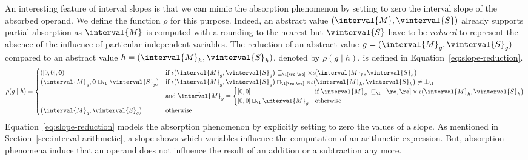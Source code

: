 An interesting feature of interval slopes is that we can mimic the
absorption phenomenon by setting to zero the interval slope of the
absorbed operand. We define the function $\rho$ for this
purpose. Indeed, an abstract value $(\interval{M}, \vinterval{S})$
already supports partial absorption as $\interval{M}$ is computed with
a rounding to the nearest but $\vinterval{S}$ have to be
\textit{reduced} to represent the absence of the influence of
particular independent variables. The reduction of an abstract value
$g=(\interval{M}_g, \vinterval{S}_g)$ compared to an abstract value
$h=(\interval{M}_h, \vinterval{S}_h)$, denoted by $\rho(g \mid h)$, is
defined in Equation~\eqref{eq:slope-reduction}.  {\small
  \begin{equation}
    \label{eq:slope-reduction}
    \rho(g \mid h) =         
    \begin{cases}
      ([0, 0], \mathbf{0}) & \text{if } 
      \iota\big(\interval{M}_g, \vinterval{S}_g\big)
      \sqsubseteq_\I [\re,\re]
      \times \iota\big(\interval{M}_h, \vinterval{S}_h\big)
      \\
      \big(\tilde{\interval{M}}_g, 
      \mathbf{0}\ \dot{\sqcup}_\I\ \vinterval{S}_g\big) 
      & \text{if } \iota
      \big(\interval{M}_g, \vinterval{S}_g\big) \sqcap_\I 
      [\re, \re] \times \iota\big(\interval{M}_h, \vinterval{S}_h\big)
      \neq \bot_\I
      \\
      & \text{and } \tilde{\interval{M}}_g =
      \begin{cases}
        [0, 0] & \text{if } \interval{M}_g\ \sqsubseteq_\I\ [\re,\re]
        \times
        \iota\big(\interval{M}_h, \vinterval{S}_h\big)
        \\
[0, 0] \sqcup_\I \interval{M}_g & \text{otherwise}
      \end{cases}
      \\
      \big(\interval{M}_g, \vinterval{S}_g\big) & \text{otherwise}
    \end{cases}
  \end{equation}
}Equation~\eqref{eq:slope-reduction} models the absorption phenomenon
by explicitly setting to zero the values of a slope. As mentioned in
Section~\ref{sec:interval-arithmetic}, a slope shows which variables
influence the computation of an arithmetic expression. But, absorption
phenomena induce that an operand does not influence the result of an
addition or a subtraction any more.

